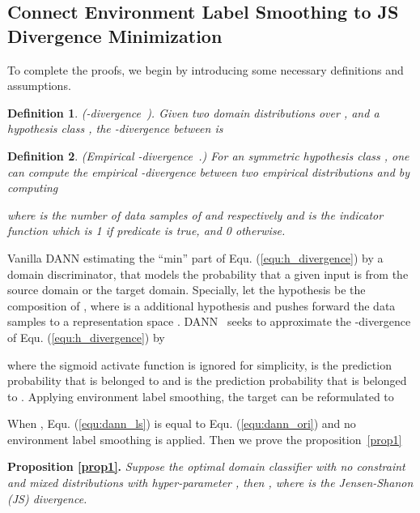 \documentclass{article} \usepackage{iclr2023_conference,times}
\newtheorem{definition}{Definition}
\newcommand{\myref}[1]{Equ. (\ref{#1})}
\begin{document}
\subsection{Connect Environment Label Smoothing to JS Divergence Minimization}\label{sec:theo_js}
To complete the proofs, we begin by introducing some necessary definitions and assumptions. 

\begin{definition}
(-divergence~\citep{2006Analysis}). Given two domain distributions  over , and a hypothesis class , the \textit{-divergence} between  is

\label{define1}
\end{definition}

\begin{definition}
(Empirical -divergence~\citep{2006Analysis}.)
For an symmetric hypothesis class , one can compute the \textit{empirical -divergence} between two empirical distributions  and  by computing

where  is the number of data samples of  and  respectively and  is the indicator function which is 1 if predicate  is true, and 0 otherwise.
\label{define2}
\end{definition}

Vanilla DANN estimating the ``min'' part of \myref{equ:h_divergence} by a domain discriminator, that models the probability that a given input is from the source domain or the target domain. Specially, let the hypothesis  be the composition of , where  is a additional hypothesis and  pushes forward the data samples to a representation space . DANN~\citep{2006Analysis} seeks to approximate the -divergence of \myref{equ:h_divergence} by

where the sigmoid activate function is ignored for simplicity,  is the prediction probability that  is belonged to  and  is the prediction probability that  is belonged to . Applying environment label smoothing, the target can be reformulated to 

When , \myref{equ:dann_ls} is equal to \myref{equ:dann_ori} and no environment label smoothing is applied. Then we prove the proposition~\ref{prop1}

\noindent\textbf{Proposition \ref{prop1}.} \textit{Suppose  the optimal domain classifier with no constraint and mixed distributions  with hyper-parameter , then , where  is the Jensen-Shanon (JS) divergence.}
\end{document}
